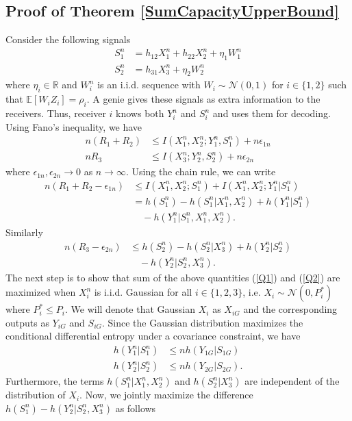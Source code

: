 \documentclass[10pt,conference]{IEEEtran}
\begin{document}
\begin{appendices}
\section{Proof of Theorem \ref{SumCapacityUpperBound}}
\label{SumCapacityUpperBoundProof}
Consider the following signals
\begin{align}
S_1^n&=h_{12}X_1^n+h_{22}X_2^n+\eta_1W_1^n\\
S_2^n&=h_{31}X_3^n+\eta_2W_2^n
\end{align}
where $\eta_i\in\mathbb{R}$ and $W_i^n$ is an i.i.d. sequence with $W_i\sim\mathcal{N}(0,1)$ for $i\in\{1,2\}$ such that $\mathbb{E}[W_iZ_i]=\rho_i$. A genie gives these signals as extra information to the receivers. Thus, receiver $i$ knows both $Y_i^n$ and $S_i^n$ and uses them for decoding. Using Fano's inequality, we have
\begin{align}
n(R_1+R_2)&\leq I(X_1^n,X_2^n;Y_1^n,S_1^n)+n\epsilon_{1n}\\
nR_3&\leq I(X_3^n;Y_2^n,S_2^n)+n\epsilon_{2n}
\end{align}
where $\epsilon_{1n},\epsilon_{2n}\to0$ as $n\to\infty$. Using the chain rule, we can write
\begin{align}
n(R_1+R_2-\epsilon_{1n})&\leq I(X_1^n,X_2^n;S_1^n)+I(X_1^n,X_2^n;Y_1^n|S_1^n)\nonumber\\
&=h(S_1^n)-h(S_1^n|X_1^n,X_2^n)+h(Y_1^n|S_1^n)\nonumber\\
\label{Q1}
&\quad-h(Y_1^n|S_1^n,X_1^n,X_2^n).
\end{align}
Similarly
\begin{align}
n(R_3-\epsilon_{2n})&\leq h(S_2^n)-h(S_2^n|X_3^n)+h(Y_2^n|S_2^n)\nonumber\\
\label{Q2}
&\quad-h(Y_2^n|S_2^n,X_3^n).
\end{align}
The next step is to show that sum of the above quantities (\ref{Q1}) and (\ref{Q2}) are maximized when $X_i^n$ is i.i.d. Gaussian for all $i\in\{1,2,3\}$, i.e. $X_i\sim\mathcal{N}(0,P_i^*)$ where $P_i^*\leq P_i$. We will denote that Gaussian $X_i$ as $X_{iG}$ and the corresponding outputs as $Y_{iG}$ and $S_{iG}$. Since the Gaussian distribution maximizes the conditional differential entropy under a covariance constraint, we have
\begin{align}
h(Y_1^n|S_1^n)&\leq nh(Y_{1G}|S_{1G})\\
h(Y_2^n|S_2^n)&\leq nh(Y_{2G}|S_{2G}).
\end{align}
Furthermore, the terms $h(S_1^n|X_1^n,X_2^n)$ and $h(S_2^n|X_3^n)$ are independent of the distribution of $X_i$. Now, we jointly maximize the difference $h(S_1^n)-h(Y_2^n|S_2^n,X_3^n)$ as follows

\end{appendices}
\end{document}
